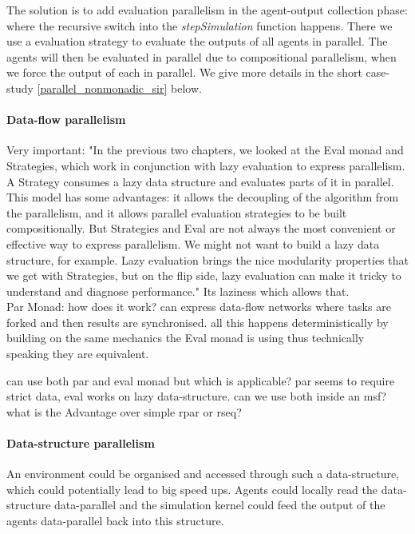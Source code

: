 The solution is to add evaluation parallelism in the agent-output collection phase: where the recursive switch into the \textit{stepSimulation} function happens. There we use a evaluation strategy to evaluate the outputs of all agents in parallel. The agents will then be evaluated in parallel due to compositional parallelism, when we force the output of each in parallel. We give more details in the short case-study \ref{parallel_nonmonadic_sir} below.

\paragraph{Data-flow parallelism}
Very important: "In the previous two chapters, we looked at the Eval monad and Strategies, which work in conjunction with lazy evaluation to express parallelism. A Strategy consumes a lazy data structure and evaluates parts of it in parallel. This model has some advantages: it allows the decoupling of the algorithm from the parallelism, and it allows parallel evaluation strategies to be built compositionally. But Strategies and Eval are not always the most convenient or effective way to express parallelism. We might not want to build a lazy data structure, for example. Lazy evaluation brings the nice modularity properties that we get with Strategies, but on the flip side, lazy evaluation can make it tricky to understand and diagnose performance."
Its laziness which allows that.\\

Par Monad: how does it work? can express data-flow networks where tasks are forked and then results are synchronised. all this happens deterministically by building on the same mechanics the Eval monad is using thus technically speaking they are equivalent. 

can use both par and eval monad but which is applicable? par seems to require strict data, eval works on lazy data-structure. can we use both inside an msf? what is the Advantage over simple rpar or rseq?\\


\paragraph{Data-structure parallelism}
An environment could be organised and accessed through such a data-structure, which could potentially lead to big speed ups. Agents could locally read the data-structure data-parallel and the simulation kernel could feed the output of the agents data-parallel back into this structure.

